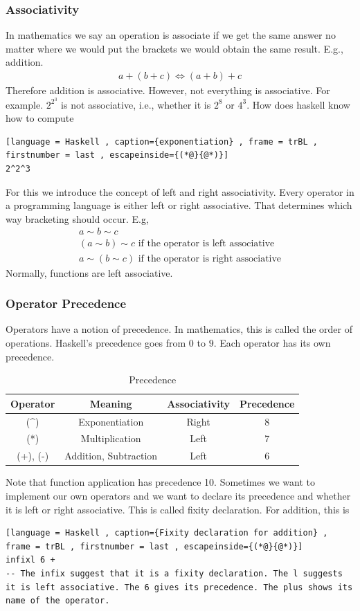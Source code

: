 \documentclass[a4paper]{article}
\theoremstyle{plain}
\theoremstyle{definition}
\theoremstyle{remark}
\begin{document}
\subsubsection{Associativity}
In mathematics we say an operation is associate if we get the same answer no matter where we would put the brackets we would obtain the same result. E.g., addition.
\begin{align*}
	a+(b+c) \iff (a+b)+c
\end{align*}
Therefore addition is associative. However, not everything is associative. For example. $2^{2^{3}}$ is not associative, i.e., whether it is $2^{8}$ or $4^{3}$. How does haskell know how to compute
\begin{lstlisting}[language = Haskell , caption={exponentiation} , frame = trBL , firstnumber = last , escapeinside={(*@}{@*)}]
2^2^3
\end{lstlisting}
For this we introduce the concept of left and right associativity. Every operator in a programming language is either left or right associative. That determines which way bracketing should occur. E.g,
\begin{align*}
	a \sim b \sim c \\
	(a \sim b) \sim c \text{ if the operator is left associative}\\
	a \sim (b \sim c) \text{ if the operator is right associative}
\end{align*}
Normally, functions are left associative. 
\subsubsection{Operator Precedence}
Operators have a notion of precedence. In mathematics, this is called the order of operations. Haskell's precedence goes from $0$ to $9$. Each operator has its own precedence.
\begin{table}[H]
	\centering
	\caption{Precedence}
	\label{tab:precedence}
	\begin{tabular}{|c|c|c|c|}
		\hline
	Operator & Meaning & Associativity & Precedence \\ 
	\hline
	(\textasciicircum) & Exponentiation & Right & 8 \\
	(*) & Multiplication & Left & 7 \\
	(+), (-) & Addition, Subtraction & Left & 6 \\
	\hline
	\end{tabular}
\end{table}
Note that function application has precedence 10.
Sometimes we want to implement our own operators and we want to declare its precedence and whether it is left or right associative. This is called fixity declaration. For addition, this is
\begin{lstlisting}[language = Haskell , caption={Fixity declaration for addition} , frame = trBL , firstnumber = last , escapeinside={(*@}{@*)}]
infixl 6 +
-- The infix suggest that it is a fixity declaration. The l suggests it is left associative. The 6 gives its precedence. The plus shows its name of the operator.
\end{lstlisting}
\end{document}
